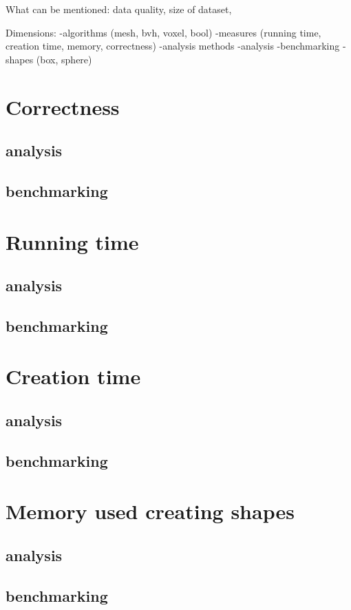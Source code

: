 \documentclass[11pt,twoside,a4paper]{report}
\begin{document}
What can be mentioned: data quality, size of dataset, 

Dimensions: 
-algorithms (mesh, bvh, voxel, bool)
-measures (running time, creation time, memory, correctness)
-analysis methods
  -analysis
  -benchmarking
    -shapes (box, sphere)
    
\section{Correctness}
\subsection{analysis}
\subsection{benchmarking}

\section{Running time}
\subsection{analysis}
\subsection{benchmarking}

\section{Creation time}
\subsection{analysis}
\subsection{benchmarking}

\section{Memory used creating shapes}
\subsection{analysis}
\subsection{benchmarking}
    
\end{document}
